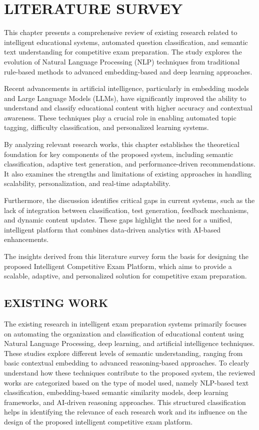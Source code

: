 \chapter{\MakeUppercase{LITERATURE SURVEY}}
\begin{sloppypar}

This chapter presents a comprehensive review of existing research related to intelligent educational systems, automated question classification, and semantic text understanding for competitive exam preparation. The study explores the evolution of Natural Language Processing (NLP) techniques from traditional rule-based methods to advanced embedding-based and deep learning approaches.

Recent advancements in artificial intelligence, particularly in embedding models and Large Language Models (LLMs), have significantly improved the ability to understand and classify educational content with higher accuracy and contextual awareness. These techniques play a crucial role in enabling automated topic tagging, difficulty classification, and personalized learning systems.

By analyzing relevant research works, this chapter establishes the theoretical foundation for key components of the proposed system, including semantic classification, adaptive test generation, and performance-driven recommendations. It also examines the strengths and limitations of existing approaches in handling scalability, personalization, and real-time adaptability.

Furthermore, the discussion identifies critical gaps in current systems, such as the lack of integration between classification, test generation, feedback mechanisms, and dynamic content updates. These gaps highlight the need for a unified, intelligent platform that combines data-driven analytics with AI-based enhancements.

The insights derived from this literature survey form the basis for designing the proposed Intelligent Competitive Exam Platform, which aims to provide a scalable, adaptive, and personalized solution for competitive exam preparation.

\section{\MakeUppercase{EXISTING WORK}}

The existing research in intelligent exam preparation systems primarily focuses on automating the organization and classification of educational content using Natural Language Processing, deep learning, and artificial intelligence techniques. These studies explore different levels of semantic understanding, ranging from basic contextual embedding to advanced reasoning-based approaches. To clearly understand how these techniques contribute to the proposed system, the reviewed works are categorized based on the type of model used, namely NLP-based text classification, embedding-based semantic similarity models, deep learning frameworks, and AI-driven reasoning approaches. This structured classification helps in identifying the relevance of each research work and its influence on the design of the proposed intelligent competitive exam platform.


\end{sloppypar}
